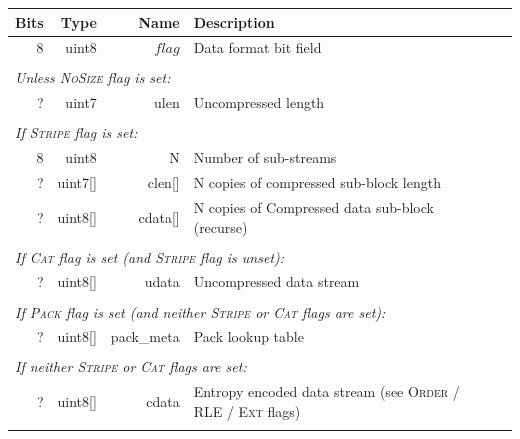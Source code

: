 \documentclass[a4paper]{article}
\begin{document}
\begin{table}[h]
\centering
\begin{tabular}{|r|r|r|r|p{9cm}|l|}
\hline
\multicolumn{2}{|r|}{\textbf{Bits} } & \textbf{Type}  & \textbf{Name} & \multicolumn{2}{p{9cm}|}{\textbf{Description}} \\
\hline
\multicolumn{2}{|r|}{8} & uint8 & $flag$ & \multicolumn{2}{p{9cm}|}{Data format bit field}\\
\cline{1-6}

\multicolumn{6}{|l|}{}\\[-0.3em]
\multicolumn{6}{|l|}{\textit{Unless \textsc{NoSize} flag is set:} } \\
\cline{2-5}
& ? & uint7 & ulen & Uncompressed length & \\
\cline{2-5}

\multicolumn{6}{|l|}{}\\[-0.3em]
\multicolumn{6}{|l|}{\textit{If \textsc{Stripe} flag is set:} } \\
\cline{2-5}
& 8 & uint8 & N & Number of sub-streams & \\
& ? & uint7[] & clen[] & N copies of compressed sub-block length & \\
& ? & uint8[] & cdata[] & N copies of Compressed data sub-block (recurse) & \\
\cline{2-5}

\multicolumn{6}{|l|}{}\\[-0.7em]
\multicolumn{6}{|l|}{\textit{If \textsc{Cat} flag is set (and \textsc{Stripe} flag is unset):} } \\
\cline{2-5}
& ? & uint8[] & udata & Uncompressed data stream & \\
\cline{2-5}

\multicolumn{6}{|l|}{}\\[-0.7em]
\multicolumn{6}{|l|}{\textit{If \textsc{Pack} flag is set (and neither \textsc{Stripe} or \textsc{Cat} flags are set):} } \\
\cline{2-5}
& ? & uint8[] & pack\_meta & Pack lookup table & \\
\cline{2-5}

\multicolumn{6}{|l|}{}\\[-0.7em]
\multicolumn{6}{|l|}{\textit{If neither \textsc{Stripe} or \textsc{Cat} flags are set:} } \\
\cline{2-5}
& ? & uint8[] & cdata & Entropy encoded data stream (see \textsc{Order} / \textsc{RLE} / \textsc{Ext} flags) & \\
\cline{2-5}
\multicolumn{6}{|l|}{}\\
\hline
\end{tabular}
\end{table}
\end{document}
